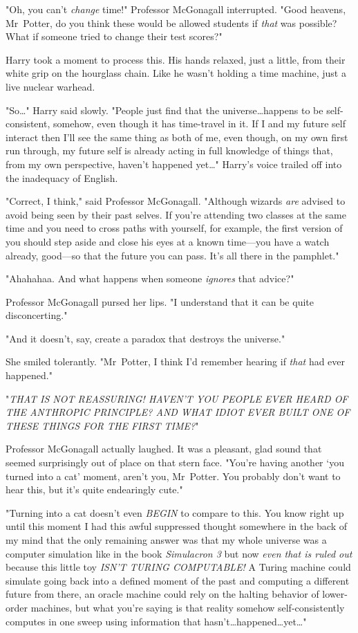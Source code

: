 "Oh, you can't \emph{change} time!" Professor McGonagall interrupted. "Good
heavens, Mr~Potter, do you think these would be allowed students if
\emph{that} was possible? What if someone tried to change their test scores?"

Harry took a moment to process this. His hands relaxed, just a little, from
their white grip on the hourglass chain. Like he wasn't holding a time machine,
just a live nuclear warhead.

"So…" Harry said slowly. "People just find that the universe…happens
to be self-consistent, somehow, even though it has time-travel in it.
If I and my future self interact then I'll see the same thing as both of me,
even though, on my own first run through, my future self is already acting in
full knowledge of things that, from my own perspective, haven't happened
yet…" Harry's voice trailed off into the inadequacy of English.

"Correct, I think," said Professor McGonagall. "Although wizards \emph{are}
advised to avoid being seen by their past selves. If you're attending two
classes at the same time and you need to cross paths with yourself, for
example, the first version of you should step aside and close his eyes at a
known time—you have a watch already, good—so that the future you can pass.
It's all there in the pamphlet."

"Ahahahaa. And what happens when someone \emph{ignores} that advice?"

Professor McGonagall pursed her lips. "I understand that it can be quite
disconcerting."

"And it doesn't, say, create a paradox that destroys the universe."

She smiled tolerantly. "Mr~Potter, I think I'd remember hearing if \emph{that}
had ever happened."

"\emph{THAT IS NOT REASSURING! HAVEN'T YOU PEOPLE EVER HEARD OF THE ANTHROPIC
PRINCIPLE? AND WHAT IDIOT EVER BUILT ONE OF THESE THINGS FOR THE FIRST TIME?}"

Professor McGonagall actually laughed. It was a pleasant, glad sound that
seemed surprisingly out of place on that stern face. "You're having another
`you turned into a cat' moment, aren't you, Mr~Potter. You probably don't want
to hear this, but it's quite endearingly cute."

"Turning into a cat doesn't even \emph{BEGIN} to compare to this. You know
right up until this moment I had this awful suppressed thought somewhere in the
back of my mind that the only remaining answer was that my whole universe was a
computer simulation like in the book \emph{Simulacron 3} but now \emph{even
that is ruled out} because this little toy \emph{ISN'T TURING COMPUTABLE!} A
Turing machine could simulate going back into a defined moment of the past and
computing a different future from there, an oracle machine could rely on the
halting behavior of lower-order machines, but what you're saying is that
reality somehow self-consistently computes in one sweep using information that
hasn't…happened…yet…"

